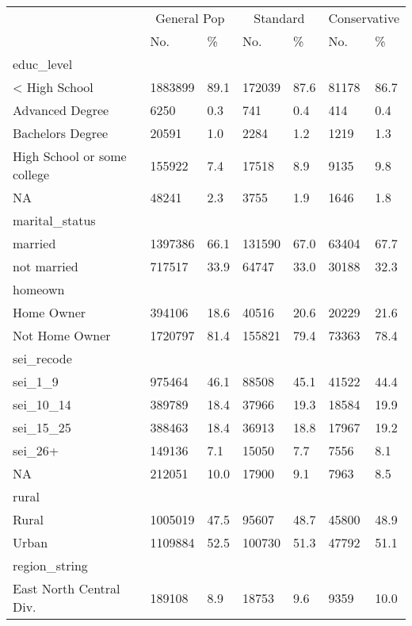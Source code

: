 \captionsetup[table]{labelformat=empty,skip=1pt}
\begin{longtable}{lllllll}
\toprule
 & \multicolumn{2}{c}{General Pop} & \multicolumn{2}{c}{Standard} & \multicolumn{2}{c}{Conservative} \\ 
 \cmidrule(lr){2-3} \cmidrule(lr){4-5} \cmidrule(lr){6-7}
 & No. & \% & No. & \% & No. & \% \\ 
\midrule
\multicolumn{1}{l}{educ\_level} \\ 
\midrule
< High School & 1883899 & 89.1 & 172039 & 87.6 & 81178 & 86.7 \\ 
Advanced Degree & 6250 & 0.3 & 741 & 0.4 & 414 & 0.4 \\ 
Bachelors Degree & 20591 & 1.0 & 2284 & 1.2 & 1219 & 1.3 \\ 
High School or some college & 155922 & 7.4 & 17518 & 8.9 & 9135 & 9.8 \\ 
NA & 48241 & 2.3 & 3755 & 1.9 & 1646 & 1.8 \\ 
\midrule
\multicolumn{1}{l}{marital\_status} \\ 
\midrule
married & 1397386 & 66.1 & 131590 & 67.0 & 63404 & 67.7 \\ 
not married & 717517 & 33.9 & 64747 & 33.0 & 30188 & 32.3 \\ 
\midrule
\multicolumn{1}{l}{homeown} \\ 
\midrule
Home Owner & 394106 & 18.6 & 40516 & 20.6 & 20229 & 21.6 \\ 
Not Home Owner & 1720797 & 81.4 & 155821 & 79.4 & 73363 & 78.4 \\ 
\midrule
\multicolumn{1}{l}{sei\_recode} \\ 
\midrule
sei\_1\_9 & 975464 & 46.1 & 88508 & 45.1 & 41522 & 44.4 \\ 
sei\_10\_14 & 389789 & 18.4 & 37966 & 19.3 & 18584 & 19.9 \\ 
sei\_15\_25 & 388463 & 18.4 & 36913 & 18.8 & 17967 & 19.2 \\ 
sei\_26+ & 149136 & 7.1 & 15050 & 7.7 & 7556 & 8.1 \\ 
NA & 212051 & 10.0 & 17900 & 9.1 & 7963 & 8.5 \\ 
\midrule
\multicolumn{1}{l}{rural} \\ 
\midrule
Rural & 1005019 & 47.5 & 95607 & 48.7 & 45800 & 48.9 \\ 
Urban & 1109884 & 52.5 & 100730 & 51.3 & 47792 & 51.1 \\ 
\midrule
\multicolumn{1}{l}{region\_string} \\ 
\midrule
East North Central Div. & 189108 & 8.9 & 18753 & 9.6 & 9359 & 10.0 \\ 

\end{longtable}
